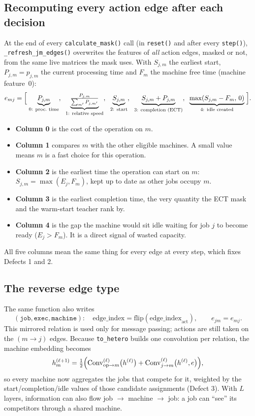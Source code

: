 \documentclass[11pt,a4paper]{article}
\newcommand{\code}[1]{\texttt{#1}}
\theoremstyle{remark}
\begin{document}
\subsection{Recomputing every action edge after each decision}
At the end of every \code{calculate\_mask()} call (in \code{reset()} and after every
\code{step()}), \code{\_refresh\_jm\_edges()} overwrites the features of \emph{all} action
edges, masked or not, from the same live matrices the mask uses. With $S_{j,m}$ the earliest
start, $P_{j,m}=p_{j,m}$ the current processing time and $F_m$ the machine free time
(machine feature~0):
\[
  e_{mj} =
  \Bigl[\;
    \underbrace{P_{j,m}}_{\text{0: proc.\ time}},\;\;
    \underbrace{\tfrac{P_{j,m}}{\sum_{m'}P_{j,m'}}}_{\text{1: relative speed}},\;\;
    \underbrace{S_{j,m}}_{\text{2: start}},\;\;
    \underbrace{S_{j,m}+P_{j,m}}_{\text{3: completion (ECT)}},\;\;
    \underbrace{\max(S_{j,m}-F_m,\,0)}_{\text{4: idle created}}
  \;\Bigr].
\]
\begin{itemize}
  \item \textbf{Column 0} is the cost of the operation on $m$.
  \item \textbf{Column 1} compares $m$ with the other eligible machines. A small value
        means $m$ is a fast choice for this operation.
  \item \textbf{Column 2} is the earliest time the operation can start on $m$:
        $S_{j,m}=\max(E_j,F_m)$, kept up to date as other jobs occupy $m$.
  \item \textbf{Column 3} is the earliest completion time, the very quantity the ECT mask
        and the warm-start teacher rank by.
  \item \textbf{Column 4} is the gap the machine would sit idle waiting for job $j$
        to become ready ($E_j>F_m$). It is a direct signal of wasted capacity.
\end{itemize}
All five columns mean the same thing for every edge at every step, which fixes Defects
1 and 2.

\subsection{The reverse edge type}
The same function also writes
\[
  (\code{job},\code{exec},\code{machine}):\quad
  \text{edge\_index} = \text{flip}(\text{edge\_index}_{\mathrm{act}}),\qquad
  e_{jm} = e_{mj}.
\]
This mirrored relation is used only for message passing; actions are still taken on the
$(m\to j)$ edges. Because \code{to\_hetero} builds one convolution per relation, the
machine embedding becomes
\[
  h_m^{(\ell+1)} = \tfrac12\Bigl(
     \mathrm{Conv}^{(\ell)}_{\mathrm{op}\to m}\bigl(h^{(\ell)}\bigr) +
     \mathrm{Conv}^{(\ell)}_{j\to m}\bigl(h^{(\ell)}, e\bigr)
  \Bigr),
\]
so every machine now aggregates the jobs that compete for it, weighted by the
start/completion/idle values of those candidate assignments (Defect 3). With $L$ layers,
information can also flow job $\to$ machine $\to$ job: a job can ``see'' its competitors
through a shared machine.
\end{document}

